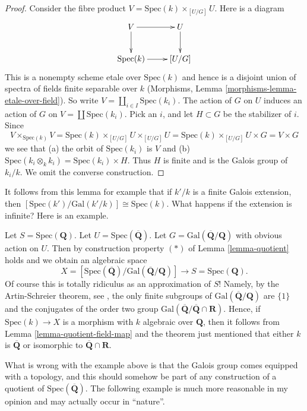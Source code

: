 \begin{proof}
Consider the fibre product $V = \text{Spec}(k) \times_{[U/G]} U$.
Here is a diagram
$$
\xymatrix{
V \ar[r] \ar[d] & U \ar[d] \\
\text{Spec}(k) \ar[r] & [U/G]
}
$$
This is a nonempty scheme etale over $\text{Spec}(k)$ and hence is a
disjoint union of spectra of fields finite separable over $k$
(Morphisms, Lemma \ref{morphisms-lemma-etale-over-field}). So write
$V = \coprod_{i \in I} \text{Spec}(k_i)$.
The action of $G$ on $U$ induces an action of $G$ on
$V = \coprod \text{Spec}(k_i)$. Pick an $i$, and let $H \subset G$ be
the stabilizer of $i$. Since
$$
V \times_{\text{Spec}(k)} V =
\text{Spec}(k) \times_{[U/G]} U \times_{[U/G]} U =
\text{Spec}(k) \times_{[U/G]} U \times G =
V \times G
$$
we see that (a) the orbit of $\text{Spec}(k_i)$ is $V$ and
(b) $\text{Spec}(k_i \otimes_k k_i) = \text{Spec}(k_i) \times H$.
Thus $H$ is finite and is the Galois group of $k_i/k$.
We omit the converse construction.
\end{proof}

\noindent
It follows from this lemma for example that
if $k'/k$ is a finite Galois extension, then
$[\text{Spec}(k')/\text{Gal}(k'/k)] \cong \text{Spec}(k)$.
What happens if the extension is infinite? Here is an example.

\begin{example}
\label{example-Qbar}
Let $S = \text{Spec}(\mathbf{Q})$.
Let $U = \text{Spec}(\overline{\mathbf{Q}})$.
Let $G = \text{Gal}(\overline{\mathbf{Q}}/\mathbf{Q})$ with obvious
action on $U$. Then by construction property $(*)$ of
Lemma \ref{lemma-quotient} holds and we obtain an algebraic space
$$
X = [\text{Spec}(\overline{\mathbf{Q}})/
\text{Gal}(\overline{\mathbf{Q}}/\mathbf{Q})]
\longrightarrow
S = \text{Spec}(\mathbf{Q}).
$$
Of course this is totally ridiculus as an approximation of $S$!
Namely, by the Artin-Schreier theorem,
see \cite[Theorem 17, page 316]{JacobsonIII},
the only finite subgroups of $\text{Gal}(\overline{\mathbf{Q}}/\mathbf{Q})$
are $\{1\}$ and the conjugates of the order two group
$\text{Gal}(\overline{\mathbf{Q}}/\overline{\mathbf{Q}} \cap \mathbf{R})$.
Hence, if
$\text{Spec}(k) \to X$ is a morphism with $k$ algebraic over $\mathbf{Q}$,
then it follows from Lemma \ref{lemma-quotient-field-map} and the theorem
just mentioned that either $k$ is $\overline{\mathbf{Q}}$ or isomorphic to
$\overline{\mathbf{Q}} \cap \mathbf{R}$.
\end{example}

\noindent
What is wrong with the example above is that
the Galois group comes equipped with a topology,
and this should somehow be part of any construction
of a quotient of $\text{Spec}(\overline{\mathbf{Q}})$.
The following example is much more reasonable in my opinion
and may actually occur in ``nature''.

